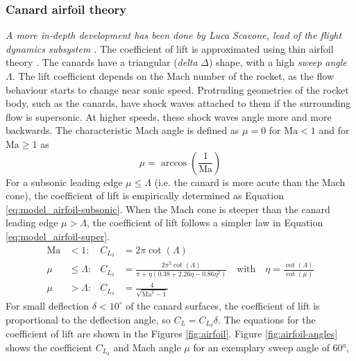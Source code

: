 \subsubsection{Canard airfoil theory}
\textit{A more in-depth development has been done by Luca Scavone, lead of the flight dynamics subsystem \cite{team-flight-luca}}.
The coefficient of lift is approximated using thin airfoil theory \cite{stengel2004}.
The canards have a triangular (\textit{delta} $\Delta$) shape, with a high \textit{sweep angle} $\Lambda$. 
The lift coefficient depends on the Mach number of the rocket, as the flow behaviour starts to change near sonic speed.
Protruding geometries of the rocket body, such as the canards, have shock waves attached to them if the surrounding flow is supersonic.
At higher speeds, these shock waves angle more and more backwards. 
The characteristic Mach angle is defined as $\mu = 0$ for $\mathrm{Ma} < 1$ and for $\mathrm{Ma} \geq 1$ as \cite{stengel2004}
\begin{equation}
    \mu = \arccos(\frac{1}{\mathrm{Ma}})
\end{equation}
For a subsonic leading edge $\mu \leq \Lambda$ (i.e. the canard is more acute than the Mach cone), the coefficient of lift is empirically determined \cite{stengel2004} as Equation \ref{eq:model_airfoil-subsonic}.
When the Mach cone is steeper than the canard leading edge $\mu > \Lambda$, the coefficient of lift follows a simpler law \cite{stengel2004} in Equation \ref{eq:model_airfoil-super}.
\begin{align}
    \mathrm{Ma} &<  1: & C_{L_\delta} &= 2 \pi\cot(\Lambda)
    \\
    \mu &\leq \Lambda : & C_{L_\delta} &= \frac{2 \pi^2 \cot(\Lambda)}{\pi + \eta (0.38 + 2.26 \eta - 0.86 \eta^2)} \quad \text{with} \quad \eta = \frac{\cot(\Lambda)}{\cot(\mu)} \label{eq:model_airfoil-subsonic} 
    \\
    \mu &> \Lambda : &C_{L_\delta} &= \frac{4}{\sqrt{\mathrm{Ma}^2-1}} \label{eq:model_airfoil-super}
\end{align}
For small deflection $\delta < 10^\circ$ of the canard surfaces, the coefficient of lift is proportional to the deflection angle, so $C_L = C_{L_\delta} \delta$.
The equations for the coefficient of lift are shown in the Figures \ref{fig:airfoil}.
Figure \ref{fig:airfoil-angles} shows the coefficient $C_{L_\delta}$ and Mach angle $\mu$ for an exemplary sweep angle of 60°, 

